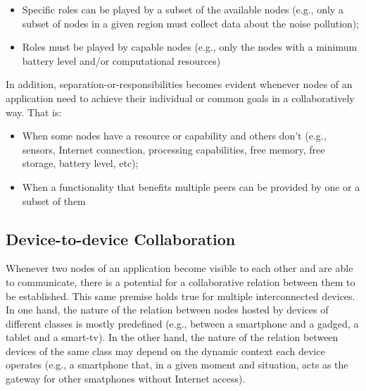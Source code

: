 \begin{itemize}
	\item Specific roles can be played by a subset of the available nodes (e.g., only a subset of nodes in a given region must collect data about the noise pollution);
	
	\item Roles must be played by capable nodes (e.g., only the nodes with a minimum battery level and/or computational resources)
\end{itemize}


In addition, separation-or-responsibilities becomes evident whenever nodes of an application need to achieve their individual or common goals in a collaboratively way. That is:

\begin{itemize}
	
	\item When some nodes have a resource or capability and others don't (e.g., sensors, Internet connection, processing capabilities, free memory, free storage, battery level, etc);
	
	\item When a functionality that benefits multiple peers can be provided by one or a subset of them
	
\end{itemize}

\subsection{Device-to-device Collaboration}

Whenever two nodes of an application become visible to each other and are able to communicate, there is a potential for a collaborative relation between them to be established. 
This same premise holds true for multiple interconnected devices. 
In one hand, the nature of the relation between nodes hosted by devices of different classes is mostly predefined (e.g., between a smartphone and a gadged, a tablet and a smart-tv). In the other hand, the nature of the relation between devices of the same class may depend on the dynamic context each device operates (e.g., a smartphone that, in a given moment and situation, acts as the gateway for other smatphones without Internet access). 



